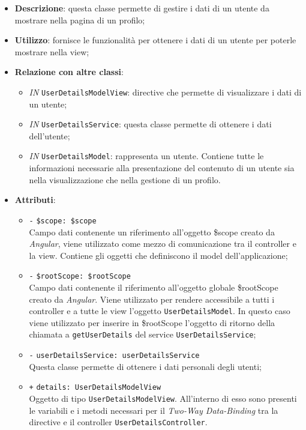 \begin{itemize}
	\item \textbf{Descrizione}: questa classe permette di gestire i dati di un utente da mostrare nella pagina di un profilo;
	\item \textbf{Utilizzo}: fornisce le funzionalità per ottenere i dati di un utente per poterle mostrare nella view;
	\item \textbf{Relazione con altre classi}:
	\begin{itemize}
		\item \textit{IN} \texttt{UserDetailsModelView}: directive che permette di visualizzare i dati di un utente; 
		\item \textit{IN} \texttt{UserDetailsService}: questa classe permette di ottenere i dati dell'utente;
		\item \textit{IN} \texttt{UserDetailsModel}: rappresenta un utente. Contiene tutte le informazioni necessarie alla presentazione del contenuto di un utente sia nella visualizzazione che nella gestione di un profilo.
	\end{itemize}
	\item \textbf{Attributi}:
	\begin{itemize}
		\item \texttt{-} \texttt{\$scope: \$scope} \\
		Campo dati contenente un riferimento all’oggetto \$scope creato da \textit{Angular}, viene utilizzato come mezzo di comunicazione tra il controller e la view. Contiene gli oggetti che definiscono il model dell’applicazione;
		\item \texttt{-} \texttt{\$rootScope: \$rootScope} \\
		Campo dati contenente il riferimento all'oggetto globale \$rootScope creato da \textit{Angular}. Viene utilizzato per rendere accessibile a tutti i controller e a tutte le view l'oggetto \texttt{UserDetailsModel}. In questo caso viene utilizzato per inserire in \$rootScope l'oggetto di ritorno della chiamata a \texttt{getUserDetails} del service \texttt{UserDetailsService};
		\item \texttt{-} \texttt{userDetailsService: userDetailsService} \\ Questa classe permette di ottenere i dati personali degli utenti;
		\item \texttt{+} \texttt{details: UserDetailsModelView} \\
		Oggetto di tipo \texttt{UserDetailsModelView}. All'interno di esso sono presenti le variabili e i metodi necessari per il \textit{Two-Way Data-Binding} tra la directive e il controller \texttt{UserDetailsController}.

\end{itemize}
\end{itemize}
